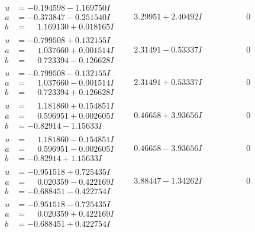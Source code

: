 \documentclass[1p]{elsarticle_modified}
\theoremstyle{definition}
\begin{document}
$$\begin{array}{c|c|c}
\begin{aligned}
u &= -0.194598 - 1.169750 I \\
a &= -0.373847 - 0.251540 I \\
b &= \phantom{-}1.169130 + 0.018165 I\end{aligned}
 & \phantom{-}3.29951 + 2.40492 I & \phantom{-0.000000 } 0 \\ \hline\begin{aligned}
u &= -0.799508 + 0.132155 I \\
a &= \phantom{-}1.037660 + 0.001514 I \\
b &= \phantom{-}0.723394 - 0.126628 I\end{aligned}
 & \phantom{-}2.31491 - 0.53337 I & \phantom{-0.000000 } 0 \\ \hline\begin{aligned}
u &= -0.799508 - 0.132155 I \\
a &= \phantom{-}1.037660 - 0.001514 I \\
b &= \phantom{-}0.723394 + 0.126628 I\end{aligned}
 & \phantom{-}2.31491 + 0.53337 I & \phantom{-0.000000 } 0 \\ \hline\begin{aligned}
u &= \phantom{-}1.181860 + 0.154851 I \\
a &= \phantom{-}0.596951 + 0.002605 I \\
b &= -0.82914 - 1.15633 I\end{aligned}
 & \phantom{-}0.46658 + 3.93656 I & \phantom{-0.000000 } 0 \\ \hline\begin{aligned}
u &= \phantom{-}1.181860 - 0.154851 I \\
a &= \phantom{-}0.596951 - 0.002605 I \\
b &= -0.82914 + 1.15633 I\end{aligned}
 & \phantom{-}0.46658 - 3.93656 I & \phantom{-0.000000 } 0 \\ \hline\begin{aligned}
u &= -0.951518 + 0.725435 I \\
a &= \phantom{-}0.020359 - 0.422169 I \\
b &= -0.688451 - 0.422754 I\end{aligned}
 & \phantom{-}3.88447 - 1.34262 I & \phantom{-0.000000 } 0 \\ \hline\begin{aligned}
u &= -0.951518 - 0.725435 I \\
a &= \phantom{-}0.020359 + 0.422169 I \\
b &= -0.688451 + 0.422754 I\end{aligned}

\end{array}$$
\end{document}
